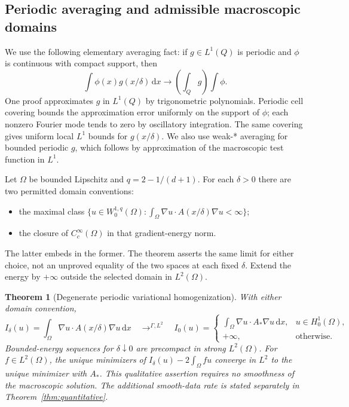 \documentclass[11pt,a4paper]{article}
\numberwithin{equation}{section}
\newtheorem{theorem}{Theorem}[section]
\theoremstyle{definition}
\theoremstyle{remark}\newtheorem{remark}[theorem]{Remark}
\newcommand{\dd}{\,\mathrm dx}
\begin{document}


\subsection{Periodic averaging and admissible macroscopic domains}

We use the following elementary averaging fact: if \(g\in L^1(Q)\)
is periodic and \(\phi\) is continuous with compact support, then
\[
 \int\phi(x)g(x/\delta)\dd
       \longrightarrow\left(\int_Qg\right)\int\phi.
\]
One proof approximates \(g\) in \(L^1(Q)\) by trigonometric polynomials.
Periodic cell covering bounds the approximation error uniformly on
the support of \(\phi\); each nonzero Fourier mode tends to zero
by oscillatory integration. The same covering gives uniform local
\(L^1\) bounds for \(g(x/\delta)\). We also use weak-* averaging
for bounded periodic \(g\), which follows by approximation of the
macroscopic test function in \(L^1\).

Let \(\Omega\) be bounded Lipschitz and \(q=2-1/(d+1)\).
For each \(\delta>0\) there are two permitted domain conventions:
\begin{itemize}
 \item the maximal class
 \(\{u\in W^{1,q}_0(\Omega):
       \int_\Omega\nabla u\cdot A(x/\delta)\nabla u<\infty\}\);
 \item the closure of \(C_c^\infty(\Omega)\) in that gradient-energy norm.
\end{itemize}
The latter embeds in the former. The theorem asserts the same limit
for either choice, not an unproved equality of the two spaces at
each fixed \(\delta\).
Extend the energy by \(+\infty\) outside the selected domain in \(L^2(\Omega)\).

\begin{theorem}[Degenerate periodic variational homogenization]
\label{thm:homogenization}
With either domain convention,
\[
 I_\delta(u)=\int_\Omega\nabla u\cdot A(x/\delta)\nabla u\dd
 \quad\mathop{\longrightarrow}^{\Gamma,L^2}\quad
 I_0(u)=
 \begin{cases}
 \displaystyle\int_\Omega\nabla u\cdot A_*\nabla u\dd,
                           &u\in H^1_0(\Omega),\\
 +\infty,&\text{otherwise}.
 \end{cases}
\]
Bounded-energy sequences for \(\delta\downarrow0\) are precompact in
strong \(L^2(\Omega)\). For \(f\in L^2(\Omega)\), the unique minimizers
of \(I_\delta(u)-2\int_\Omega fu\) converge in \(L^2\) to the unique
minimizer with \(A_*\).
This qualitative assertion requires no smoothness of the macroscopic
solution. The additional smooth-data rate is stated separately in
Theorem~\ref{thm:quantitative}.
\end{theorem}
\end{document}
